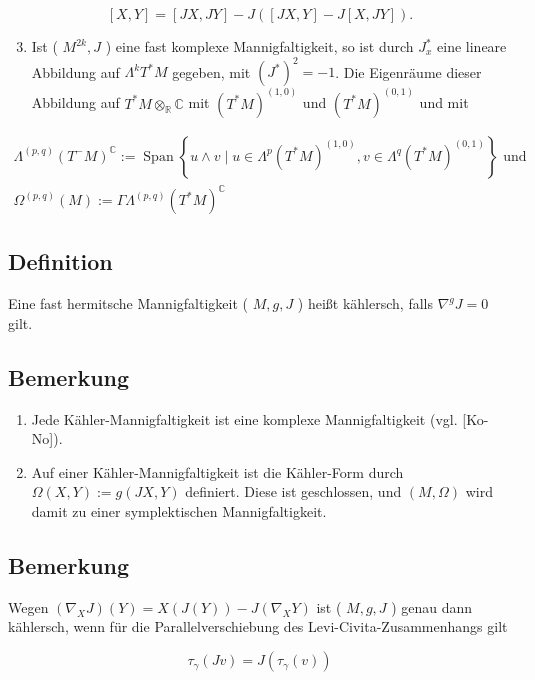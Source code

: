 \documentclass[10pt, letterpaper]{article}
\begin{document}
$$
[X, Y]=[J X, J Y]-J([J X, Y]-J[X, J Y]) .
$$

\begin{enumerate}
  \setcounter{enumi}{2}
  \item Ist ( $M^{2 k}, J$ ) eine fast komplexe Mannigfaltigkeit, so ist durch $J_{x}^{*}$ eine lineare Abbildung auf $\Lambda^{k} T^{*} M$ gegeben, mit $\left(J^{*}\right)^{2}=-1$. Die Eigenräume dieser Abbildung auf $T^{*} M \otimes_{\mathbb{R}} \mathbb{C}$ mit $\left(T^{*} M\right)^{(1,0)}$ und $\left(T^{*} M\right)^{(0,1)}$ und mit
\end{enumerate}

$$
\begin{gathered}
\Lambda^{(p, q)}\left(T^{-} M\right)^{\mathbb{C}}:=\operatorname{Span}\left\{u \wedge v \mid u \in \Lambda^{p}\left(T^{*} M\right)^{(1,0)}, v \in \Lambda^{q}\left(T^{*} M\right)^{(0,1)}\right\} \text { und } \\
\Omega^{(p, q)}(M):=\Gamma \Lambda^{(p, q)}\left(T^{*} M\right)^{\mathbb{C}}
\end{gathered}
$$

\subsection*{Definition}
Eine fast hermitsche Mannigfaltigkeit ( $M, g, J$ ) heißt kählersch, falls $\nabla^{g} J=0$ gilt.

\subsection*{Bemerkung}
\begin{enumerate}
  \item Jede Kähler-Mannigfaltigkeit ist eine komplexe Mannigfaltigkeit (vgl. [Ko-No]).
  \item Auf einer Kähler-Mannigfaltigkeit ist die Kähler-Form durch $\Omega(X, Y):= g(J X, Y)$ definiert. Diese ist geschlossen, und $(M, \Omega)$ wird damit zu einer symplektischen Mannigfaltigkeit.
\end{enumerate}

\subsection*{Bemerkung}
Wegen $\left(\nabla_{X} J\right)(Y)=X(J(Y))-J\left(\nabla_{X} Y\right)$ ist ( $M, g, J$ ) genau dann kählersch, wenn für die Parallelverschiebung des Levi-Civita-Zusammenhangs gilt

$$
\tau_{\gamma}(J v)=J\left(\tau_{\gamma}(v)\right)
$$
\end{document}
